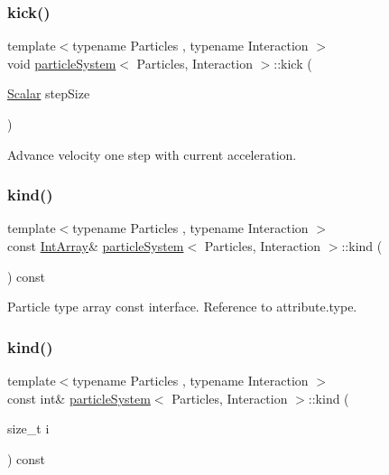 \subsubsection{\texorpdfstring{kick()}{kick()}}
{\footnotesize\ttfamily template$<$typename Particles , typename Interaction $>$ \\
void \mbox{\hyperlink{classparticle_system}{particle\+System}}$<$ Particles, Interaction $>$\+::kick (\begin{DoxyParamCaption}\item[{\mbox{\hyperlink{classparticle_system_a3938954186247e3eab01cc75fcc62b40}{Scalar}}}]{step\+Size }\end{DoxyParamCaption})\hspace{0.3cm}{\ttfamily [inline]}}



Advance velocity one step with current acceleration. 

\mbox{\label{classparticle_system_a5b41ae458724a13976117216fdf63b19}} 
\subsubsection{\texorpdfstring{kind()}{kind()}\hspace{0.1cm}{\footnotesize\ttfamily [1/2]}}
{\footnotesize\ttfamily template$<$typename Particles , typename Interaction $>$ \\
const \mbox{\hyperlink{classparticle_system_aea9c70dc1a9d1947b425f5383fb21e24}{Int\+Array}}\& \mbox{\hyperlink{classparticle_system}{particle\+System}}$<$ Particles, Interaction $>$\+::kind (\begin{DoxyParamCaption}{ }\end{DoxyParamCaption}) const\hspace{0.3cm}{\ttfamily [inline]}}



Particle type array const interface. Reference to attribute.\+type. 

\mbox{\label{classparticle_system_ad406c7bb71f92b27d918b0b36c0f9e93}} 
\subsubsection{\texorpdfstring{kind()}{kind()}\hspace{0.1cm}{\footnotesize\ttfamily [2/2]}}
{\footnotesize\ttfamily template$<$typename Particles , typename Interaction $>$ \\
const int\& \mbox{\hyperlink{classparticle_system}{particle\+System}}$<$ Particles, Interaction $>$\+::kind (\begin{DoxyParamCaption}\item[{size\+\_\+t}]{i }\end{DoxyParamCaption}) const\hspace{0.3cm}{\ttfamily [inline]}}



